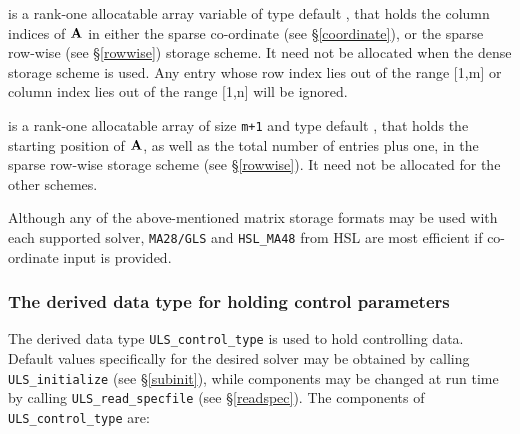 \documentclass{galahad}
\newcommand{\packagename}{ULS}
\begin{document}
\begin{description}
 is a rank-one allocatable array variable of type default \integer,
that holds the column indices of ${\mathbf{A}}$ in either the sparse co-ordinate 
(see \S\ref{coordinate}), or the sparse row-wise 
(see \S\ref{rowwise}) storage scheme.
It need not be allocated when the dense 
storage scheme is used.
Any entry whose row index lies out of the range $[$1,m$]$ or
column index lies out of the range $[$1,n$]$ will be ignored.

 is a rank-one allocatable array of size {\tt m+1} and type 
default \integer, that holds the starting position of ${\mathbf{A}}$, as well
as the total number of entries plus one, in the sparse row-wise storage
scheme (see \S\ref{rowwise}). It need not be allocated for the
other schemes.

\end{description}
Although any of the above-mentioned matrix storage formats may be used 
with each supported solver, {\tt MA28/GLS} and {\tt HSL\_MA48}
from HSL are most efficient if co-ordinate input is provided.


\subsubsection{The derived data type for holding control 
 parameters}\label{typecontrol}
The derived data type 
{\tt \packagename\_control\_type} 
is used to hold controlling data. 
Default values specifically for the desired solver
may be obtained by calling 
{\tt \packagename\_initialize}
(see \S\ref{subinit}),
while components may be changed at run time by calling 
{\tt \packagename\_read\-\_specfile}
(see \S\ref{readspec}). 
The components of 
{\tt \packagename\_control\_type} 
are:
\end{document}

